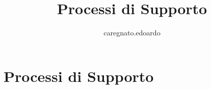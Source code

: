 \documentclass[a4paper, oneside, openany, dvipsnames, table]{article}
\title{Processi di Supporto}
\author{caregnato.edoardo }
\begin{document}

\section{Processi di Supporto}


\newpage

\newpage

\newpage

\newpage

\newpage

\newpage

\newpage

\newpage
\end{document}
